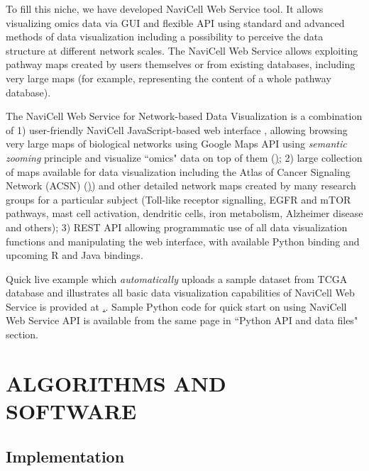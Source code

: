 \documentclass[a4,center,fleqn]{NAR}
\begin{document}
To fill this niche, we have developed NaviCell Web Service tool. It allows
visualizing omics data via GUI and flexible API using standard and advanced
methods of data visualization including a possibility to perceive the data
structure at different network scales. The NaviCell Web Service allows
exploiting pathway maps created by users themselves or from existing databases,
including very large maps (for example, representing the content of a whole
pathway database).


\enlargethispage{-65.1pt}





The NaviCell Web Service for Network-based Data
Visualization is a combination of 1) user-friendly NaviCell JavaScript-based
web interface \cite{kuperstein2013navicell}, allowing browsing very large maps
of biological networks using Google Maps API using \emph{semantic zooming}
principle and visualize ``omics" data on top of them
(\href{https://navicell.curie.fr}); 2) large collection of maps available for
data visualization including the Atlas of Cancer Signaling Network (ACSN)
(\href{https://acsn.curie.fr}))  and other detailed network maps created by many
research groups for a particular subject (Toll-like receptor signalling, EGFR
and mTOR pathways, mast cell activation, dendritic cells, iron metabolism,
Alzheimer disease and others); 3) REST API allowing programmatic use of all
data visualization functions and manipulating the web interface, with available
Python binding and upcoming R and Java bindings.

Quick live example which \emph{automatically} uploads a sample dataset from
TCGA database and illustrates all basic data visualization capabilities of
NaviCell Web Service is provided at
\href{http://navicell.curie.fr/pages/nav\_web\_service.html}.. Sample Python
code for quick start on using NaviCell Web Service API is available from the
same page in ``Python API and data files" section.

\section{ALGORITHMS AND SOFTWARE}

\subsection{Implementation}
\end{document}
